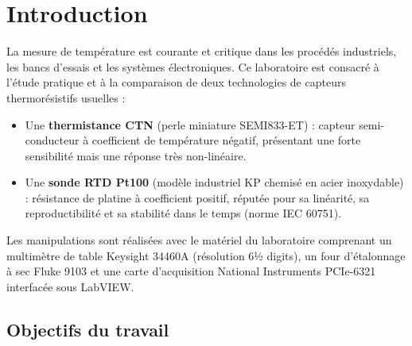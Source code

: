 \chapter{Introduction}
\label{chap:introduction}

La mesure de température est courante et critique dans les procédés industriels, les bancs d'essais et les systèmes électroniques. Ce laboratoire est consacré à l'étude pratique et à la comparaison de deux technologies de capteurs thermorésistifs usuelles :
\begin{itemize}[leftmargin=1.2cm]
    \item Une \textbf{thermistance CTN} (perle miniature SEMI833-ET) : capteur semi-conducteur à coefficient de température négatif, présentant une forte sensibilité mais une réponse très non-linéaire.
    \item Une \textbf{sonde RTD Pt100} (modèle industriel KP chemisé en acier inoxydable) : résistance de platine à coefficient positif, réputée pour sa linéarité, sa reproductibilité et sa stabilité dans le temps (norme IEC 60751).
\end{itemize}

Les manipulations sont réalisées avec le matériel du laboratoire comprenant un multimètre de table Keysight 34460A (résolution 6½ digits), un four d'étalonnage à sec Fluke 9103 et une carte d'acquisition National Instruments PCIe-6321 interfacée sous LabVIEW.

\section{Objectifs du travail}
\label{sec:intro_objectifs}

